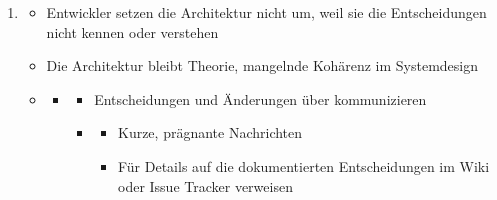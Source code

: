 \begin{infoBox}[title=Entscheidungen zur Architektur: Herausforderungen und Lösungen]
\begin{enumerate}
\begin{itemize}
\begin{itemize}
                \item {}
                \begin{itemize}
                    \item Die Gründe und Rahmenbedingungen von Entscheidungen sollten an einer  dokumentiert werden
                    \item Beispiele: formale Dokumente, besser jedoch ein Wiki mit angebundenem , das vom Entwicklungsteam genutzt wird
                \end{itemize}
            \end{itemize}
        \end{itemize}
        \item {}
        \begin{itemize}
            \item {} Entwickler setzen die Architektur nicht um, weil sie die Entscheidungen nicht kennen oder verstehen
            \item {} Die Architektur bleibt Theorie, mangelnde Kohärenz im Systemdesign
            \item {}
            \begin{itemize}
                \item {}
                \begin{itemize}
                    \item Entscheidungen und Änderungen über  kommunizieren
                    \item {}
                    \begin{itemize}
                        \item Kurze, prägnante Nachrichten
                        \item Für Details auf die dokumentierten Entscheidungen im Wiki oder Issue Tracker verweisen
                    \end{itemize}
                \end{itemize}
            \end{itemize}
        \end{itemize}
    \end{enumerate}
\end{infoBox}